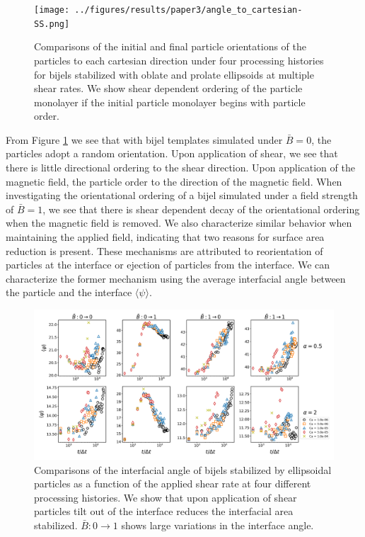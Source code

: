 \begin{figure} 
    \centering 
    \texttt{[image: ../figures/results/paper3/angle\_to\_cartesian-SS.png]} 
    \caption{Comparisons of the initial and final particle orientations of the particles to each cartesian direction under
             four processing histories for bijels stabilized with oblate and prolate ellipsoids at multiple shear rates. We show
             shear dependent ordering of the particle monolayer if the initial particle monolayer begins with particle order.} 
    \label{fig:particle_orientation_cartesian_shear} 
\end{figure}

From Figure \ref{fig:particle_orientation_cartesian_shear} we see that with bijel templates simulated under $\bar{B} = 0$, the
particles adopt a random orientation. Upon application of shear, we see that there is little directional ordering to the 
shear direction. Upon application of the magnetic field, the particle order to the direction of the magnetic field. When 
investigating the orientational ordering of a bijel simulated under a field strength of $\bar{B} = 1$, we see that there is
shear dependent decay of the orientational ordering when the magnetic field is removed. We also characterize similar behavior
when maintaining the applied field, indicating that two reasons for surface area reduction is present. These mechanisms are attributed
to reorientation of particles at the interface or ejection of particles from the interface. We can characterize the former mechanism
using the average interfacial angle between the particle and the interface $\langle \psi \rangle$.

\begin{figure} 
    \centering 
    \includegraphics[scale=0.3]{../figures/results/paper3/psi-time_compare.png} 
    \caption{Comparisons of the interfacial angle of bijels stabilized by ellipsoidal particles as a function of 
             the applied shear rate at four different processing histories. We show that upon application of shear
             particles tilt out of the interface reduces the interfacial area stabilized. $\bar{B}: 0 \to 1$ shows 
             large variations in the interface angle.} 
    \label{fig:interface_angle_shear} 
\end{figure}

